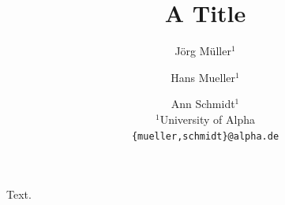 \documentclass{article}
\title{A Title}
\author{%
  J\"org M\"uller$^{1}$ \and
  Hans Mueller$^{1}$ \and
  Ann Schmidt$^{1}$ \\
 {\normalfont $^1$University of Alpha} \\
 \texttt{\{mueller,schmidt\}@alpha.de}
}
\begin{document}
\maketitle
Text.
\end{document}
